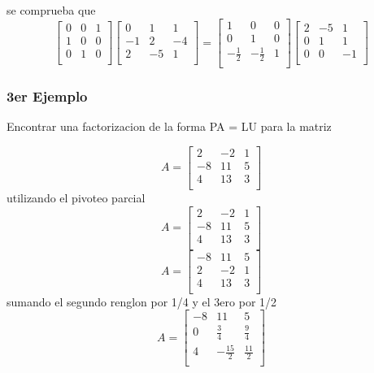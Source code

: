 \documentclass{article}
\begin{document}
se comprueba que
\[
\begin{bmatrix}
    0 & 0  & 1   \\
    1 & 0  & 0   \\
    0 & 1 & 0  \\
\end{bmatrix}
\begin{bmatrix}
    0 & 1  & 1   \\
    -1 & 2  & -4   \\
    2 & -5 & 1  \\
\end{bmatrix}
=
\begin{bmatrix}
    1 & 0  & 0   \\
    0 & 1 & 0  \\
    -\frac{1}{2} & -\frac{1}{2} & 1  \\
\end{bmatrix}
\begin{bmatrix}
    2 & -5  & 1   \\
    0 & 1  & 1   \\
    0 & 0 & -1  \\
\end{bmatrix}
\]






\subsubsection{3er Ejemplo}

Encontrar una factorizacion de la forma PA = LU para la matriz

\[
    A=
    \begin{bmatrix}
        2 & -2  & 1   \\
        -8 & 11  & 5   \\
        4 & 13 & 3   \\
    \end{bmatrix}
\]
utilizando el pivoteo parcial
\[
    A=
    \begin{bmatrix}
        2 & -2  & 1   \\
        -8 & 11  & 5   \\
        4 & 13 & 3   \\
    \end{bmatrix}
\]
\[
    A=
    \begin{bmatrix}
        -8 & 11  & 5   \\
        2 & -2  & 1   \\
        4 & 13 & 3   \\
    \end{bmatrix}
\]
sumando el segundo renglon por 1/4 y el 3ero por 1/2
\[
    A=
    \begin{bmatrix}
        -8 & 11  & 5   \\
        0 & \frac{3}{4}  & \frac{9}{4}   \\
        4 & -\frac{15}{2} & \frac{11}{2}   \\
    \end{bmatrix}
\]
\end{document}

